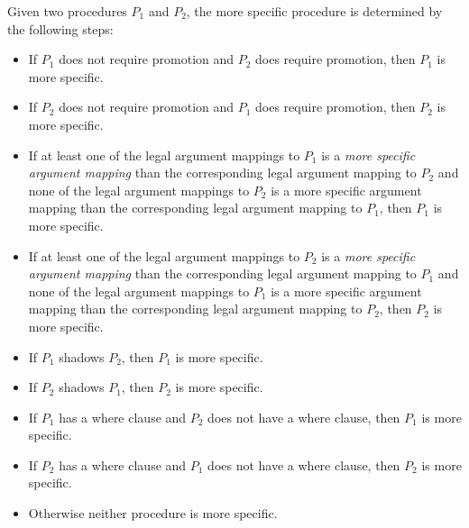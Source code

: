 Given two procedures $P_1$ and $P_2$, the more specific procedure is
determined by the following steps:
\begin{itemize}
\item If $P_1$ does not require promotion and $P_2$ does require promotion, then $P_1$ is more specific.
\item If $P_2$ does not require promotion and $P_1$ does require promotion, then $P_2$ is more specific.
\item
If at least one of the legal argument mappings to $P_1$ is a {\em more
specific argument mapping} than the corresponding legal argument
mapping to $P_2$ and none of the legal argument mappings to $P_2$ is a
more specific argument mapping than the corresponding legal argument
mapping to $P_1$, then $P_1$ is more specific.
\item
If at least one of the legal argument mappings to $P_2$ is a {\em more
specific argument mapping} than the corresponding legal argument
mapping to $P_1$ and none of the legal argument mappings to $P_1$ is a
more specific argument mapping than the corresponding legal argument
mapping to $P_2$, then $P_2$ is more specific.
\item If $P_1$ shadows $P_2$, then $P_1$ is more specific.
\item If $P_2$ shadows $P_1$, then $P_2$ is more specific.
\item If $P_1$ has a where clause and $P_2$ does not have a where clause, then $P_1$ is more specific.
\item If $P_2$ has a where clause and $P_1$ does not have a where clause, then $P_2$ is more specific.
\item Otherwise neither procedure is more specific.
\end{itemize}

